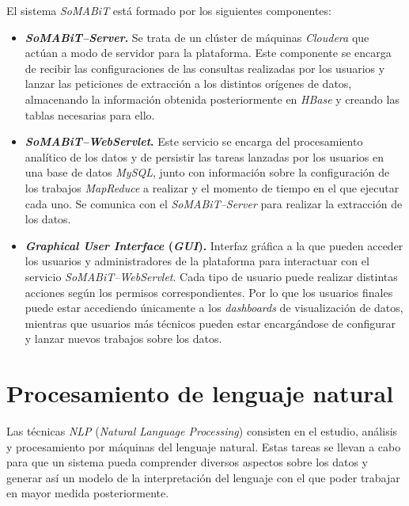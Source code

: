 
El sistema \textit{SoMABiT} está formado por los siguientes componentes:

\begin{itemize}
    \item \textbf{\textit{SoMABiT--Server}.} Se trata de un clúster de máquinas \textit{Cloudera} que actúan a modo de servidor para la plataforma. Este componente se encarga de recibir las configuraciones de las consultas realizadas por los usuarios y lanzar las peticiones de extracción a los distintos orígenes de datos, almacenando la información obtenida posteriormente en \textit{HBase} y creando las tablas necesarias para ello.

    \item \textbf{\textit{SoMABiT--WebServlet}.} Este servicio se encarga del procesamiento analítico de los datos y de persistir las tareas lanzadas por los usuarios en una base de datos \textit{MySQL}, junto con información sobre la configuración de los trabajos \textit{MapReduce} a realizar y el momento de tiempo en el que ejecutar cada uno. Se comunica con el \textit{SoMABiT--Server} para realizar la extracción de los datos.

    \item \textbf{\textit{Graphical User Interface} (\textit{GUI}).} Interfaz gráfica a la que pueden acceder los usuarios y administradores de la plataforma para interactuar con el servicio \textit{SoMABiT--WebServlet}. Cada tipo de usuario puede realizar distintas acciones según los permisos correspondientes. Por lo que los usuarios finales puede estar accediendo únicamente a los \textit{dashboards} de visualización de datos, mientras que usuarios más técnicos pueden estar encargándose de configurar y lanzar nuevos trabajos sobre los datos.
\end{itemize}

\section{Procesamiento de lenguaje natural} \label{section:theory_nlp}

Las técnicas \textit{NLP} (\textit{Natural Language Processing}) consisten en el estudio, análisis y procesamiento por máquinas del lenguaje natural. Estas tareas se llevan a cabo para que un sistema pueda comprender diversos aspectos sobre los datos y generar así un modelo de la interpretación del lenguaje con el que poder trabajar en mayor medida posteriormente.

